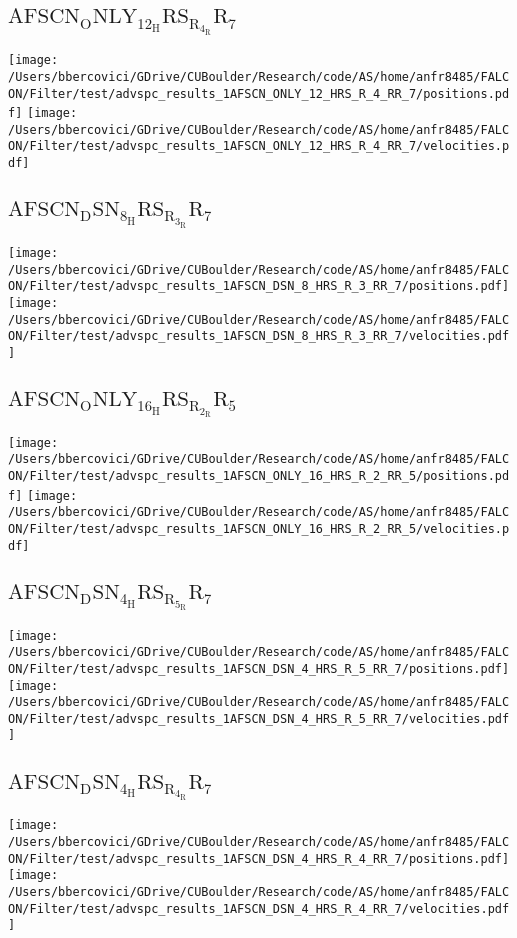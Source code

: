 \subsection{$\mathrm{AFSCN_ONLY_12_HRS_R_4_RR_7}$}
\texttt{[image: /Users/bbercovici/GDrive/CUBoulder/Research/code/AS/home/anfr8485/FALCON/Filter/test/advspc\_results\_1AFSCN\_ONLY\_12\_HRS\_R\_4\_RR\_7/positions.pdf]}
\texttt{[image: /Users/bbercovici/GDrive/CUBoulder/Research/code/AS/home/anfr8485/FALCON/Filter/test/advspc\_results\_1AFSCN\_ONLY\_12\_HRS\_R\_4\_RR\_7/velocities.pdf]}
\subsection{$\mathrm{AFSCN_DSN_8_HRS_R_3_RR_7}$}
\texttt{[image: /Users/bbercovici/GDrive/CUBoulder/Research/code/AS/home/anfr8485/FALCON/Filter/test/advspc\_results\_1AFSCN\_DSN\_8\_HRS\_R\_3\_RR\_7/positions.pdf]}
\texttt{[image: /Users/bbercovici/GDrive/CUBoulder/Research/code/AS/home/anfr8485/FALCON/Filter/test/advspc\_results\_1AFSCN\_DSN\_8\_HRS\_R\_3\_RR\_7/velocities.pdf]}
\subsection{$\mathrm{AFSCN_ONLY_16_HRS_R_2_RR_5}$}
\texttt{[image: /Users/bbercovici/GDrive/CUBoulder/Research/code/AS/home/anfr8485/FALCON/Filter/test/advspc\_results\_1AFSCN\_ONLY\_16\_HRS\_R\_2\_RR\_5/positions.pdf]}
\texttt{[image: /Users/bbercovici/GDrive/CUBoulder/Research/code/AS/home/anfr8485/FALCON/Filter/test/advspc\_results\_1AFSCN\_ONLY\_16\_HRS\_R\_2\_RR\_5/velocities.pdf]}
\subsection{$\mathrm{AFSCN_DSN_4_HRS_R_5_RR_7}$}
\texttt{[image: /Users/bbercovici/GDrive/CUBoulder/Research/code/AS/home/anfr8485/FALCON/Filter/test/advspc\_results\_1AFSCN\_DSN\_4\_HRS\_R\_5\_RR\_7/positions.pdf]}
\texttt{[image: /Users/bbercovici/GDrive/CUBoulder/Research/code/AS/home/anfr8485/FALCON/Filter/test/advspc\_results\_1AFSCN\_DSN\_4\_HRS\_R\_5\_RR\_7/velocities.pdf]}
\subsection{$\mathrm{AFSCN_DSN_4_HRS_R_4_RR_7}$}
\texttt{[image: /Users/bbercovici/GDrive/CUBoulder/Research/code/AS/home/anfr8485/FALCON/Filter/test/advspc\_results\_1AFSCN\_DSN\_4\_HRS\_R\_4\_RR\_7/positions.pdf]}
\texttt{[image: /Users/bbercovici/GDrive/CUBoulder/Research/code/AS/home/anfr8485/FALCON/Filter/test/advspc\_results\_1AFSCN\_DSN\_4\_HRS\_R\_4\_RR\_7/velocities.pdf]}
